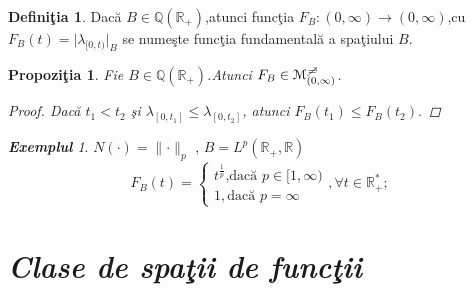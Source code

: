 \documentclass[ a4paper, 12pt]{report}
\newtheorem{prop}[theorem]{\bf Propozi\c tia }
\theoremstyle{definition}
\newtheorem{definition}{\bf Defini\c tia}[section]
\theoremstyle{remark}
\newtheorem{exemple}{\bf Exemplul}[section]
\numberwithin{equation}{section}
\begin{document}
\begin{definition}
Dac\u a $B\in \mathbb{Q}(\mathbb{R}_+)$,atunci func\c tia $F_B : (0,\infty)\rightarrow(0,\infty)$,cu \hspace{5mm} $F_B{(t)} = \lvert \lambda_ {[0,t)} \rvert_B$ se nume\c ste func\c tia fundamental\u a a spa\c tiului $B$.
\end{definition}
\begin{prop}
Fie $B\in \mathbb{Q}(\mathbb{R}_+)$.Atunci $F_B \in \mathcal{M}_{(0,\infty)}^ {\mc} $.
\begin{proof}
Dac\u a $t_1 < t_2$ \c si $\lambda_{[0,t_1]} \leqslant \lambda_{[0,t_2]}$, atunci $F_B{(t_1)}\leqslant F_B{(t_2)}.$
\end{proof}
\end{prop}
\begin{exemple}
$N(\cdot) = \lVert \cdot \rVert_p$ , $B = L^p(\mathbb{R}_+ , \mathbb{R})$\\
\[
F_B{(t)}=
\begin{cases}
t^{\frac{1}{p}} \text{,dac\u a $p \in [1,\infty)$} \\
1 ,\text{dac\u a $p = \infty$} 
\end{cases}, \forall  t \in \mathbb{R}_+^{*};
\]
\end{exemple}


\section{\textit{Clase de spa\c tii de func\c tii}}
\end{document}
